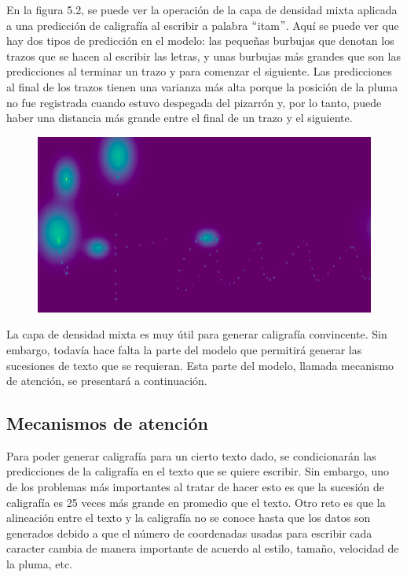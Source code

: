 \vspace{1em}

En la figura 5.2, se puede ver la operación de la capa de densidad mixta aplicada a una predicción de caligrafía al escribir a palabra $``$itam$"$. Aquí se puede ver que hay dos tipos de predicción en el modelo: las pequeñas burbujas que denotan los trazos que se hacen al escribir las letras, y unas burbujas más grandes que son las predicciones al terminar un trazo y para comenzar el siguiente. Las predicciones al final de los trazos tienen una varianza más alta porque la posición de la pluma no fue registrada cuando estuvo despegada del pizarrón y, por lo tanto, puede haber una distancia más grande entre el final de un trazo y el siguiente.
\cite{DBLP:journals/corr/Graves13}

\begin{figure}[h]
\begin{center}
\includegraphics{./imag/mdn.png}
\end{center}
\caption{}
\end{figure}

\vspace{1em}

La capa de densidad mixta es muy útil para generar caligrafía convincente. Sin embargo, todavía hace falta la parte del modelo que permitirá generar las sucesiones de texto que se requieran. Esta parte del modelo, llamada mecanismo de atención, se presentará a continuación.

\subsection{Mecanismos de atención}
Para poder generar caligrafía para un cierto texto dado, se condicionarán las predicciones de la caligrafía en el texto que se quiere escribir. Sin embargo, uno de los problemas más importantes al tratar de hacer esto es que la sucesión de caligrafía es 25 veces más grande en promedio que el texto. Otro reto es que la alineación entre el texto y la caligrafía no se conoce hasta que los datos son generados debido a que el número de coordenadas usadas para escribir cada caracter cambia de manera importante de acuerdo al estilo, tamaño, velocidad de la pluma, etc. 
\cite{DBLP:journals/corr/Graves13}

